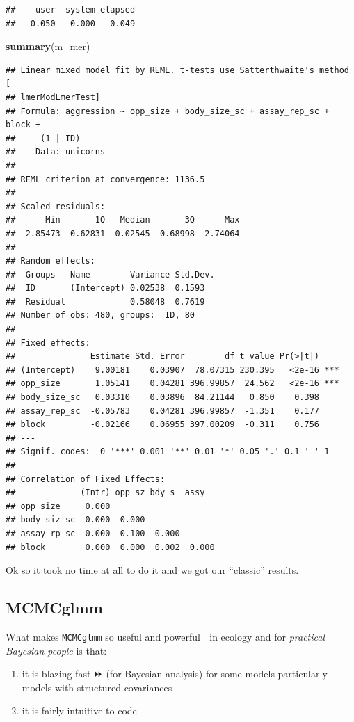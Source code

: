 \documentclass[
  12pt,
]{book}
\newenvironment{Shaded}{\begin{snugshade}}{\end{snugshade}}
\newcommand{\KeywordTok}[1]{\textcolor[rgb]{0.13,0.29,0.53}{\textbf{#1}}}
\newcommand{\NormalTok}[1]{#1}
\providecommand{\tightlist}{%
  \setlength{\itemsep}{0pt}\setlength{\parskip}{0pt}}
\begin{document}
\begin{verbatim}
##    user  system elapsed 
##   0.050   0.000   0.049
\end{verbatim}

\begin{Shaded}
\begin{Highlighting}[]
\KeywordTok{summary}\NormalTok{(m\_mer)}
\end{Highlighting}
\end{Shaded}

\begin{verbatim}
## Linear mixed model fit by REML. t-tests use Satterthwaite's method [
## lmerModLmerTest]
## Formula: aggression ~ opp_size + body_size_sc + assay_rep_sc + block +  
##     (1 | ID)
##    Data: unicorns
## 
## REML criterion at convergence: 1136.5
## 
## Scaled residuals: 
##      Min       1Q   Median       3Q      Max 
## -2.85473 -0.62831  0.02545  0.68998  2.74064 
## 
## Random effects:
##  Groups   Name        Variance Std.Dev.
##  ID       (Intercept) 0.02538  0.1593  
##  Residual             0.58048  0.7619  
## Number of obs: 480, groups:  ID, 80
## 
## Fixed effects:
##               Estimate Std. Error        df t value Pr(>|t|)    
## (Intercept)    9.00181    0.03907  78.07315 230.395   <2e-16 ***
## opp_size       1.05141    0.04281 396.99857  24.562   <2e-16 ***
## body_size_sc   0.03310    0.03896  84.21144   0.850    0.398    
## assay_rep_sc  -0.05783    0.04281 396.99857  -1.351    0.177    
## block         -0.02166    0.06955 397.00209  -0.311    0.756    
## ---
## Signif. codes:  0 '***' 0.001 '**' 0.01 '*' 0.05 '.' 0.1 ' ' 1
## 
## Correlation of Fixed Effects:
##             (Intr) opp_sz bdy_s_ assy__
## opp_size     0.000                     
## body_siz_sc  0.000  0.000              
## assay_rp_sc  0.000 -0.100  0.000       
## block        0.000  0.000  0.002  0.000
\end{verbatim}

Ok so it took no time at all to do it and we got our ``classic'' results.

\hypertarget{mcmcglmm}{%
\subsection{MCMCglmm}\label{mcmcglmm}}

What makes \texttt{MCMCglmm} so useful and powerful 💪 in ecology and for \emph{practical Bayesian people} is that:

\begin{enumerate}
\def\labelenumi{\arabic{enumi}.}
\tightlist
\item
  it is blazing fast ⏩ (for Bayesian analysis) for some models particularly models with structured covariances
\item
  it is fairly intuitive to code
\end{enumerate}
\end{document}
